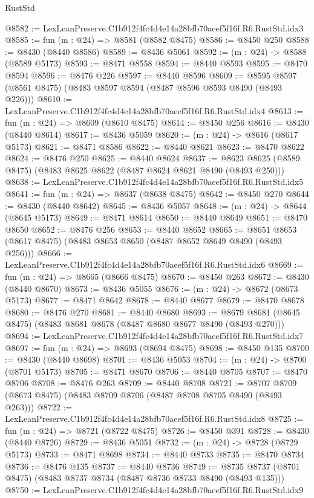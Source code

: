 \begin{lexlean}{RustStd}
\begin{coremodule}
@8582 := LexLeanPreserve.C1b912f4fc4d4e14a28bfb70aeef5f16f.R6.RustStd.idx3
@8585 := fun (m : @24) => @8581 (@8582 @8475)
@8586 := @8450 @250
@8588 := @8430 (@8440 @8586)
@8589 := @8436 @5061
@8592 := (m : @24) -> @8588 (@8589 @5173)
@8593 := @8471 @8558
@8594 := @8440 @8593
@8595 := @8470 @8594
@8596 := @8476 @226
@8597 := @8440 @8596
@8609 := @8595 @8597 (@8561 @8475) (@8483 @8597 @8594 (@8487 @8596 @8593 @8490 (@8493 @226)))
@8610 := LexLeanPreserve.C1b912f4fc4d4e14a28bfb70aeef5f16f.R6.RustStd.idx4
@8613 := fun (m : @24) => @8609 (@8610 @8475)
@8614 := @8450 @256
@8616 := @8430 (@8440 @8614)
@8617 := @8436 @5059
@8620 := (m : @24) -> @8616 (@8617 @5173)
@8621 := @8471 @8586
@8622 := @8440 @8621
@8623 := @8470 @8622
@8624 := @8476 @250
@8625 := @8440 @8624
@8637 := @8623 @8625 (@8589 @8475) (@8483 @8625 @8622 (@8487 @8624 @8621 @8490 (@8493 @250)))
@8638 := LexLeanPreserve.C1b912f4fc4d4e14a28bfb70aeef5f16f.R6.RustStd.idx5
@8641 := fun (m : @24) => @8637 (@8638 @8475)
@8642 := @8450 @270
@8644 := @8430 (@8440 @8642)
@8645 := @8436 @5057
@8648 := (m : @24) -> @8644 (@8645 @5173)
@8649 := @8471 @8614
@8650 := @8440 @8649
@8651 := @8470 @8650
@8652 := @8476 @256
@8653 := @8440 @8652
@8665 := @8651 @8653 (@8617 @8475) (@8483 @8653 @8650 (@8487 @8652 @8649 @8490 (@8493 @256)))
@8666 := LexLeanPreserve.C1b912f4fc4d4e14a28bfb70aeef5f16f.R6.RustStd.idx6
@8669 := fun (m : @24) => @8665 (@8666 @8475)
@8670 := @8450 @263
@8672 := @8430 (@8440 @8670)
@8673 := @8436 @5055
@8676 := (m : @24) -> @8672 (@8673 @5173)
@8677 := @8471 @8642
@8678 := @8440 @8677
@8679 := @8470 @8678
@8680 := @8476 @270
@8681 := @8440 @8680
@8693 := @8679 @8681 (@8645 @8475) (@8483 @8681 @8678 (@8487 @8680 @8677 @8490 (@8493 @270)))
@8694 := LexLeanPreserve.C1b912f4fc4d4e14a28bfb70aeef5f16f.R6.RustStd.idx7
@8697 := fun (m : @24) => @8693 (@8694 @8475)
@8698 := @8450 @135
@8700 := @8430 (@8440 @8698)
@8701 := @8436 @5053
@8704 := (m : @24) -> @8700 (@8701 @5173)
@8705 := @8471 @8670
@8706 := @8440 @8705
@8707 := @8470 @8706
@8708 := @8476 @263
@8709 := @8440 @8708
@8721 := @8707 @8709 (@8673 @8475) (@8483 @8709 @8706 (@8487 @8708 @8705 @8490 (@8493 @263)))
@8722 := LexLeanPreserve.C1b912f4fc4d4e14a28bfb70aeef5f16f.R6.RustStd.idx8
@8725 := fun (m : @24) => @8721 (@8722 @8475)
@8726 := @8450 @391
@8728 := @8430 (@8440 @8726)
@8729 := @8436 @5051
@8732 := (m : @24) -> @8728 (@8729 @5173)
@8733 := @8471 @8698
@8734 := @8440 @8733
@8735 := @8470 @8734
@8736 := @8476 @135
@8737 := @8440 @8736
@8749 := @8735 @8737 (@8701 @8475) (@8483 @8737 @8734 (@8487 @8736 @8733 @8490 (@8493 @135)))
@8750 := LexLeanPreserve.C1b912f4fc4d4e14a28bfb70aeef5f16f.R6.RustStd.idx9

\end{coremodule}
\end{lexlean}
